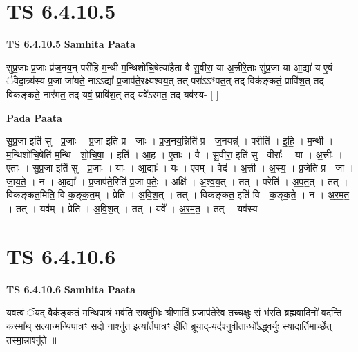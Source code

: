 \documentclass[17pt]{extarticle}
\begin{document}
\section*{ TS 6.4.10.5 }

\textbf{TS 6.4.10.5 } \newline
\textbf{Samhita Paata} \newline

सुप्र॒जाः प्र॒जाः प्र॑ज॒नय॒न् परी॑हि म॒न्थी म॒न्थिशो॑चि॒षेत्या॑है॒ता वै सु॒वीरा॒ या अ॒त्त्रीरे॒ताः सु॑प्र॒जा या आ॒द्या॑ य ए॒वं ॅवेदा॒त्र्य॑स्य प्र॒जा जा॑यते॒ नाऽऽद्या᳚ प्र॒जाप॑ते॒रक्ष्य॑श्वय॒त् तत् परा॑ऽऽ*पत॒त् तद् विक॑ङ्कतं॒ प्रावि॑श॒त् तद् विक॑ङ्कते॒ नार॑मत॒ तद् यवं॒ प्रावि॑श॒त् तद् यवे॑ऽरमत॒ तद् यव॑स्य- [  ] \newline

\textbf{Pada Paata} \newline

सु॒प्र॒जा इति॑ सु - प्र॒जाः । प्र॒जा इति॑ प्र - जाः । प्र॒ज॒नय॒न्निति॑ प्र - ज॒नयन्न्॑ । परीति॑ । इ॒हि॒ । म॒न्थी । म॒न्थिशो॑चि॒षेति॑ म॒न्थि - शो॒चि॒षा॒ । इति॑ । आ॒ह॒ । ए॒ताः । वै । सु॒वीरा॒ इति॑ सु - वीराः᳚ । या । अ॒त्त्रीः । ए॒ताः । सु॒प्र॒जा इति॑ सु - प्र॒जाः । याः । आ॒द्याः᳚ । यः । ए॒वम् । वेद॑ । अ॒त्त्री । अ॒स्य॒ । प्र॒जेति॑ प्र - जा । जा॒य॒ते॒ । न । आ॒द्या᳚ । प्र॒जाप॑ते॒रिति॑ प्र॒जा-प॒तेः॒ । अक्षि॑ । अ॒श्व॒य॒त् । तत् । परेति॑ । अ॒प॒त॒त् । तत् । विक॑ङ्कत॒मिति॒ वि-क॒ङ्क॒त॒म् । प्रेति॑ । अ॒वि॒श॒त् । तत् । विक॑ङ्कत॒ इति॑ वि - क॒ङ्क॒ते॒ । न । अ॒र॒म॒त॒ । तत् । यव᳚म् । प्रेति॑ । अ॒वि॒श॒त् । तत् । यवे᳚ । अ॒र॒म॒त॒ । तत् । यव॑स्य ।  \newline




\section*{ TS 6.4.10.6 }

\textbf{TS 6.4.10.6 } \newline
\textbf{Samhita Paata} \newline

यव॒त्वं ॅयद् वैक॑ङ्कतं मन्थिपा॒त्रं भव॑ति॒ सक्तु॑भिः श्री॒णाति॑ प्र॒जाप॑तेरे॒व तच्चक्षुः॒ सं भ॑रति ब्रह्मवा॒दिनो॑ वदन्ति॒ कस्मा᳚थ् स॒त्यान्म॑न्थिपा॒त्रꣳ सदो॒ नाश्नु॑त॒ इत्या᳚र्तपा॒त्रꣳ हीति॑ ब्रूया॒द्-यद॑श्नुवी॒तान्धो᳚ऽद्ध्व॒र्युः स्या॒दार्ति॒मार्च्छे॒त् तस्मा॒न्नाश्नु॑ते ॥ \newline
\end{document}
